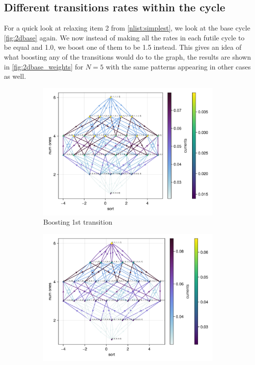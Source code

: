 \documentclass[11pt]{article}
\theoremstyle{nothm}
\begin{document}
\subsection{Different transitions rates within the cycle}
For a quick look at relaxing item 2 from \cref{nlist:simplest}, we look at the base cycle \cref{fig:2dbase} again.
We now instead of making all the rates in each futile cycle to be equal and 1.0, we boost one of them to be 1.5 instead.
This gives an idea of what boosting any of the transitions would do to the graph, the results are shown in \cref{fig:2dbase_weights} for $N=5$ with the same patterns appearing in other cases as well.

\begin{tcolorbox}
    \begin{figure}[H]
        \centering
        \begin{subfigure}[t]{0.49\textwidth}
            \centering
            \includegraphics[width=\textwidth]{../../plots/ones/c1weights/N=5w=1.png}
            \caption{Boosting 1st transition}
        \end{subfigure}
        \begin{subfigure}[t]{0.49\textwidth}
            \centering
            \includegraphics[width=\textwidth]{../../plots/ones/c1weights/N=5w=2.png}

\end{subfigure}
\end{figure}
\end{tcolorbox}
\end{document}
